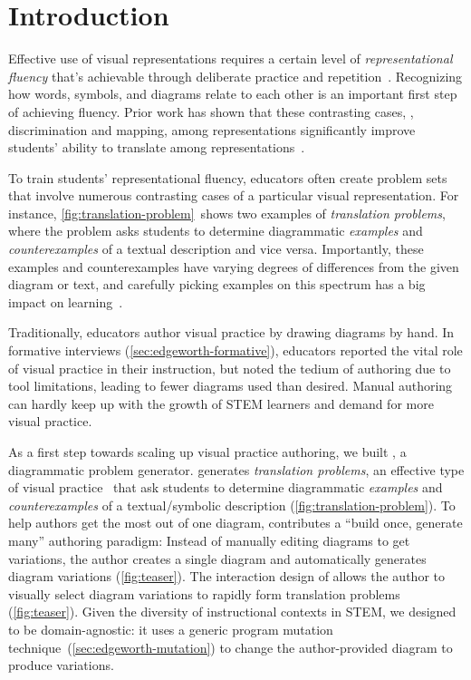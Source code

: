 \section{Introduction}

Effective use of visual representations requires a certain level of \emph{representational fluency} that's achievable through deliberate practice and repetition~\cite{metarepresentation, representationalFluency}. Recognizing how words, symbols, and diagrams relate to each other is an important first step of achieving fluency. Prior work has shown that these contrasting cases, \ie, discrimination and mapping, among representations significantly improve students' ability to translate among representations~\cite{perceptualLearning}.

To train students' representational fluency, educators often create problem sets that involve numerous contrasting cases of a particular visual representation. For instance, \cref{fig:translation-problem}~shows two examples of \emph{translation problems}, where the problem asks students to determine diagrammatic \emph{examples} and \emph{counterexamples} of a textual description and vice versa. Importantly, these examples and counterexamples have varying degrees of differences from the given diagram or text, and carefully picking examples on this spectrum has a big impact on learning~\cite{samenessAndDifference}.

Traditionally, educators author visual practice by drawing diagrams by hand. In formative interviews (\cref{sec:edgeworth-formative}), educators reported the vital role of visual practice in their instruction, but noted the tedium of authoring due to tool limitations, leading to fewer diagrams used than desired. Manual authoring can hardly keep up with the growth of STEM learners and demand for more visual practice.

As a first step towards scaling up visual practice authoring, we built \Edgeworth, a diagrammatic problem generator. \Edgeworth generates \emph{translation problems}, an effective type of visual practice~\cite{perceptualLearning} that ask students to determine diagrammatic \emph{examples} and \emph{counterexamples} of a textual/symbolic description (\cref{fig:translation-problem}). To help authors get the most out of one diagram, \Edgeworth contributes a ``build once, generate many'' authoring paradigm: Instead of manually editing diagrams to get variations, the author creates a single diagram and \Edgeworth automatically generates diagram variations (\cref{fig:teaser}). The interaction design of \Edgeworth allows the author to visually select diagram variations to rapidly form translation problems (\cref{fig:teaser}). Given the diversity of instructional contexts in STEM, we designed \Edgeworth to be domain-agnostic: it uses a generic program mutation technique~(\cref{sec:edgeworth-mutation}) to change the author-provided diagram to produce variations. 

